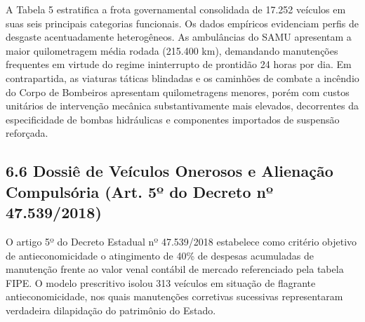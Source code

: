 \documentclass[10pt,a4paper,journal]{article}
\begin{document}
A Tabela 5 estratifica a frota governamental consolidada de 17.252 veículos em suas seis principais categorias funcionais. Os dados empíricos evidenciam perfis de desgaste acentuadamente heterogêneos. As ambulâncias do SAMU apresentam a maior quilometragem média rodada (215.400 km), demandando manutenções frequentes em virtude do regime ininterrupto de prontidão 24 horas por dia. Em contrapartida, as viaturas táticas blindadas e os caminhões de combate a incêndio do Corpo de Bombeiros apresentam quilometragens menores, porém com custos unitários de intervenção mecânica substantivamente mais elevados, decorrentes da especificidade de bombas hidráulicas e componentes importados de suspensão reforçada.

\subsection{6.6 Dossiê de Veículos Onerosos e Alienação Compulsória (Art. 5º do Decreto nº 47.539/2018)}
O artigo 5º do Decreto Estadual nº 47.539/2018 estabelece como critério objetivo de antieconomicidade o atingimento de 40\% de despesas acumuladas de manutenção frente ao valor venal contábil de mercado referenciado pela tabela FIPE. O modelo prescritivo isolou 313 veículos em situação de flagrante antieconomicidade, nos quais manutenções corretivas sucessivas representaram verdadeira dilapidação do patrimônio do Estado.
\end{document}
